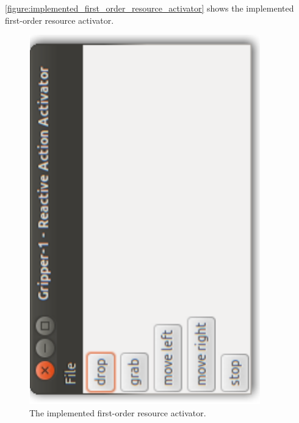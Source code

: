 {\mbox{\autoref{figure:implemented_first_order_resource_activator}}}
shows the implemented first-order resource activator.
\begin{figure}
\includegraphics[width=10cm]{gfx/implemented_first_order_resource_activator}
\caption[The implemented first-order resource activator.]{The
  implemented first-order resource activator.}
\label{figure:implemented_first_order_resource_activator}
\end{figure}

